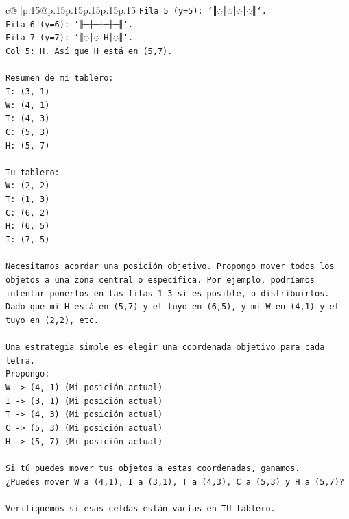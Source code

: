 \documentclass{article}
\begin{document}
{\begin{supertabular}{c@{$\;$}|p{.15\linewidth}@{}p{.15\linewidth}p{.15\linewidth}p{.15\linewidth}p{.15\linewidth}p{.15\linewidth}}
{{{\texttt{Fila 5 (y=5): `║◌│◌│◌│◌║`.} \\
\texttt{Fila 6 (y=6): `╟─┼─┼─┼─╢`.} \\
\texttt{Fila 7 (y=7): `║◌│◌│H│◌║`.} \\
\texttt{Col 5: H. Así que H está en (5,7).} \\
\\ 
\texttt{Resumen de mi tablero:} \\
\texttt{I: (3, 1)} \\
\texttt{W: (4, 1)} \\
\texttt{T: (4, 3)} \\
\texttt{C: (5, 3)} \\
\texttt{H: (5, 7)} \\
\\ 
\texttt{Tu tablero:} \\
\texttt{W: (2, 2)} \\
\texttt{T: (1, 3)} \\
\texttt{C: (6, 2)} \\
\texttt{H: (6, 5)} \\
\texttt{I: (7, 5)} \\
\\ 
\texttt{Necesitamos acordar una posición objetivo. Propongo mover todos los objetos a una zona central o específica. Por ejemplo, podríamos intentar ponerlos en las filas 1{-}3 si es posible, o distribuirlos.} \\
\texttt{Dado que mi H está en (5,7) y el tuyo en (6,5), y mi W en (4,1) y el tuyo en (2,2), etc.} \\
\\ 
\texttt{Una estrategia simple es elegir una coordenada objetivo para cada letra.} \\
\texttt{Propongo:} \\
\texttt{W {-}> (4, 1) (Mi posición actual)} \\
\texttt{I {-}> (3, 1) (Mi posición actual)} \\
\texttt{T {-}> (4, 3) (Mi posición actual)} \\
\texttt{C {-}> (5, 3) (Mi posición actual)} \\
\texttt{H {-}> (5, 7) (Mi posición actual)} \\
\\ 
\texttt{Si tú puedes mover tus objetos a estas coordenadas, ganamos.} \\
\texttt{¿Puedes mover W a (4,1), I a (3,1), T a (4,3), C a (5,3) y H a (5,7)?} \\
\\ 
\texttt{Verifiquemos si esas celdas están vacías en TU tablero.} \\
}}}
\end{supertabular}}
\end{document}
